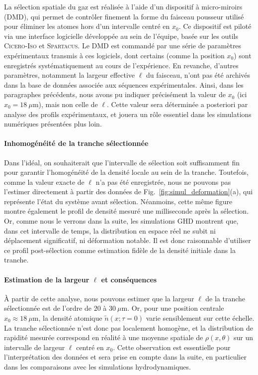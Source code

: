 La sélection spatiale du gaz est réalisée à l’aide d’un dispositif à micro-miroirs (DMD), qui permet de contrôler finement la forme du faisceau pousseur utilisé pour éliminer les atomes hors d’un intervalle centré en $x_0$. Ce dispositif est piloté via une interface logicielle développée au sein de l’équipe, basée sur les outils \textsc{Cicero-Iso} et \textsc{Spartacus}. Le DMD est commandé par une série de paramètres expérimentaux transmis à ces logiciels, dont certains (comme la position $x_0$) sont enregistrés systématiquement au cours de l’expérience. En revanche, d'autres paramètres, notamment la largeur effective $\ell$ du faisceau, n’ont pas été archivés dans la base de données associée aux séquences expérimentales. Ainsi, dans les paragraphes précédents, nous avons pu indiquer précisément la valeur de $x_0$ (ici $x_0 = 18~\mu\mathrm{m}$), mais non celle de $\ell$. Cette valeur sera déterminée a posteriori par analyse des profils expérimentaux, et jouera un rôle essentiel dans les simulations numériques présentées plus loin.

\medskip
\paragraph{Inhomogénéité de la tranche sélectionnée}

Dans l'idéal, on souhaiterait que l’intervalle de sélection soit suffisamment fin pour garantir l’homogénéité de la densité locale au sein de la tranche. Toutefois, comme la valeur exacte de $\ell$ n’a pas été enregistrée, nous ne pouvons pas l’estimer directement à partir des données de Fig.~\ref{fig:simul_deformation}(a), qui représente l’état du système avant sélection. Néanmoins, cette même figure montre également le profil de densité mesuré une milliseconde après la sélection. Or, comme nous le verrons dans la suite, les simulations GHD montrent que, dans cet intervalle de temps, la distribution en espace réel ne subit ni déplacement significatif, ni déformation notable. Il est donc raisonnable d’utiliser ce profil post-sélection comme estimation fidèle de la densité initiale dans la tranche.

\medskip
\paragraph{Estimation de la largeur $\ell$ et conséquences}

À partir de cette analyse, nous pouvons estimer que la largeur $\ell$ de la tranche sélectionnée est de l’ordre de $20$ à $30~\mu\mathrm{m}$. Or, pour une position centrale $x_0 \approx 18~\mu\mathrm{m}$, la densité atomique $\tilde{n}(x ; \tau = 0 )$ varie sensiblement sur cette échelle. La tranche sélectionnée n’est donc pas localement homogène, et la distribution de rapidité mesurée correspond en réalité à une moyenne spatiale de $\rho(x,\theta)$ sur un intervalle de largeur $\ell$ centré en $x_0$. Cette observation est essentielle pour l’interprétation des données et sera prise en compte dans la suite, en particulier dans les comparaisons avec les simulations hydrodynamiques.


